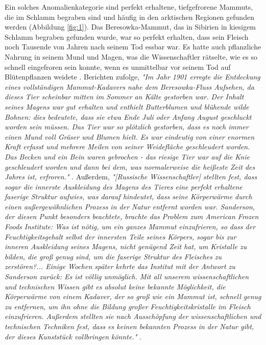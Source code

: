 \documentclass[10pt,twocolumn,letterpaper]{article}
\begin{document}
Ein solches Anomalienkategorie sind perfekt erhaltene, tiefgefrorene Mammuts, die im Schlamm begraben sind und häufig in den arktischen Regionen gefunden werden (Abbildung \ref{fig:1}). Das Beresowka-Mammut, das in Sibirien in kiesigem Schlamm begraben gefunden wurde, war so perfekt erhalten, dass sein Fleisch noch Tausende von Jahren nach seinem Tod essbar war. Es hatte auch pflanzliche Nahrung in seinem Mund und Magen, was die Wissenschaftler rätselte, wie es so schnell eingefroren sein konnte, wenn es unmittelbar vor seinem Tod auf Blütenpflanzen weidete \cite{17}. Berichten zufolge, \textit{"Im Jahr 1901 erregte die Entdeckung eines vollständigen Mammut-Kadavers nahe dem Beresowka-Fluss Aufsehen, da dieses Tier scheinbar mitten im Sommer an Kälte gestorben war. Der Inhalt seines Magens war gut erhalten und enthielt Butterblumen und blühende wilde Bohnen: dies bedeutete, dass sie etwa Ende Juli oder Anfang August geschluckt worden sein müssen. Das Tier war so plötzlich gestorben, dass es noch immer einen Mund voll Gräser und Blumen hielt. Es war eindeutig von einer enormen Kraft erfasst und mehrere Meilen von seiner Weidefläche geschleudert worden. Das Becken und ein Bein waren gebrochen - das riesige Tier war auf die Knie geschleudert worden und dann bei dem, was normalerweise die heißeste Zeit des Jahres ist, erfroren."} \cite{18}. Außerdem, \textit{"[Russische Wissenschaftler] stellten fest, dass sogar die innerste Auskleidung des Magens des Tieres eine perfekt erhaltene faserige Struktur aufwies, was darauf hindeutet, dass seine Körperwärme durch einen außergewöhnlichen Prozess in der Natur entfernt worden war. Sanderson, der diesen Punkt besonders beachtete, brachte das Problem zum American Frozen Foods Institute: Was ist nötig, um ein ganzes Mammut einzufrieren, so dass der Feuchtigkeitsgehalt selbst der innersten Teile seines Körpers, sogar bis zur inneren Auskleidung seines Magens, nicht genügend Zeit hat, um Kristalle zu bilden, die groß genug sind, um die faserige Struktur des Fleisches zu zerstören?... Einige Wochen später kehrte das Institut mit der Antwort zu Sanderson zurück: Es ist völlig unmöglich. Mit all unserem wissenschaftlichen und technischen Wissen gibt es absolut keine bekannte Möglichkeit, die Körperwärme von einem Kadaver, der so groß wie ein Mammut ist, schnell genug zu entfernen, um ihn ohne die Bildung großer Feuchtigkeitskristalle im Fleisch einzufrieren. Außerdem stellten sie nach Ausschöpfung der wissenschaftlichen und technischen Techniken fest, dass es keinen bekannten Prozess in der Natur gibt, der dieses Kunststück vollbringen könnte."} \cite{19}.
\end{document}
